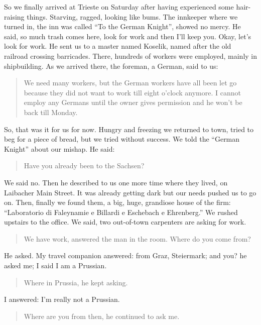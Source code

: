 \documentclass{article}
\begin{document}
So we finally arrived at Trieste on Saturday after having experienced some hair-raising things. Starving, ragged, looking like bums. The innkeeper where we turned in, the inn was called ``To the German Knight'', showed no mercy. He said, so much trash comes here, look for work and then I'll keep you. Okay, let's look for work. He sent us to a master named Koselik, named after the old railroad crossing barricades. There, hundreds of workers were employed, mainly in shipbuilding. As we arrived there, the foreman, a German, said to us:

\begin{quote}
We need many workers, but the German workers have all been let go because they did not want to work till eight o'clock anymore. I cannot employ any Germans until the owner gives permission and he won't be back till Monday.
\end{quote}

So, that was it for us for now. Hungry and freezing we returned to town, tried to beg for a piece of bread, but we tried without success. We told the ``German Knight'' about our mishap. He said:

\begin{quote}
Have you already been to the Sachsen?
\end{quote}

We said no. Then he described to us one more time where they lived, on Laibacher Main Street. It was already getting dark but our needs pushed us to go on. Then, finally we found them, a big, huge, grandiose house of the firm: ``Laboratorio di Faleynamie e Billardi e Eschebach e Ehrenberg.'' We rushed upstairs to the office. We said, two out-of-town carpenters are asking for work.

\begin{quote}
We have work, answered the man in the room. Where do you come from?
\end{quote}

He asked. My travel companion answered: from Graz, Steiermark; and you? he asked me; I said I am a Prussian.

\begin{quote}
Where in Prussia, he kept asking.
\end{quote}

I answered: I'm really not a Prussian.

\begin{quote}
Where are you from then, he continued to ask me.
\end{quote}
\end{document}
